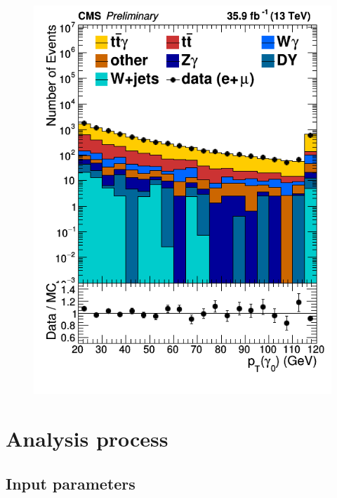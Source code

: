\documentclass[11pt]{scrartcl}
\begin{document}
\begin{figure}[H]
\begin{minipage}{.5\textwidth}
  \includegraphics[width=0.95\linewidth]{figures/PhotonGood0_pt_log.png}
  \label{fig:PhotonPTlog}
\end{minipage}
\end{figure}

\section{Analysis process}

	\subsection{Input parameters}
	
\end{document}
